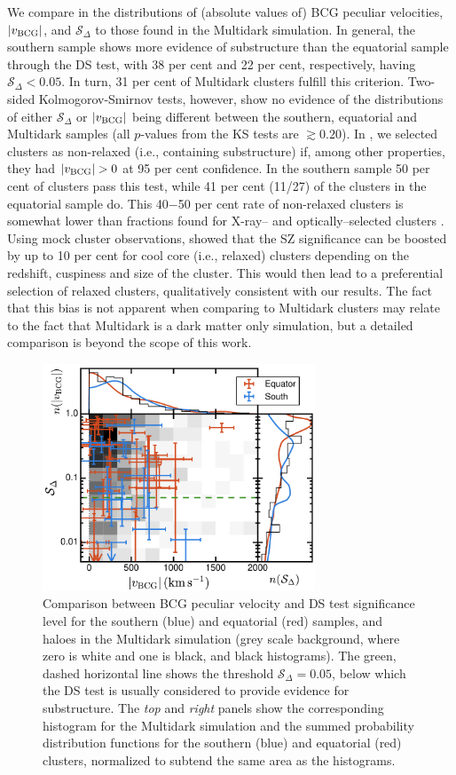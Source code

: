 We compare in  the distributions of (absolute values of) BCG peculiar velocities, $\lvert v_{\rm BCG}\rvert$, and $\mathcal{S}_\Delta$ to those found in the Multidark simulation. In general, the southern sample shows more evidence of substructure than the equatorial sample through the DS test, with 38 per cent and 22 per cent, respectively, having $\mathcal{S}_\Delta<0.05$. In turn, 31 per cent of Multidark clusters fulfill this criterion. Two-sided Kolmogorov-Smirnov tests, however, show no evidence of the distributions of either $\mathcal{S}_\Delta$ or $\lvert v_{\rm BCG}\rvert$ being different between the southern, equatorial and Multidark samples (all $p$-values from the KS tests are $\gtrsim0.20$). In \cite{sifon13}, we selected clusters as non-relaxed (i.e., containing substructure) if, among other properties, they had $\lvert v_{\rm BCG}\rvert>0$ at 95 per cent confidence. In the southern sample 50 per cent of clusters pass this test, while 41 per cent (11/27) of the clusters in the equatorial sample do. This 40$-$50 per cent rate of non-relaxed clusters is somewhat lower than fractions found for X-ray-- and optically--selected clusters \citep[e.g.,][]{bohringer10,wen13}. Using mock cluster observations, \cite{lin15} showed that the SZ significance can be boosted by up to 10 per cent for cool core (i.e., relaxed) clusters depending on the redshift, cuspiness and size of the cluster. This would then lead to a preferential selection of relaxed clusters, qualitatively consistent with our results. The fact that this bias is not apparent when comparing to Multidark clusters may relate to the fact that Multidark is a dark matter only simulation, but a detailed comparison is beyond the scope of this work.

\begin{figure}
 \centerline{\includegraphics[width=3.2in]{chapter3/vbcg_dstest-sims_full_dslog.pdf}}
\caption{Comparison between BCG peculiar velocity and DS test significance level for the southern 
(blue) and equatorial (red) samples, and haloes in the Multidark simulation (grey scale background, where zero is white and one is black, and black histograms). The green, dashed horizontal line shows the threshold $\mathcal{S}_\Delta=0.05$, below which the DS test is usually considered to provide evidence for substructure. The \textit{top} and \textit{right} panels show the corresponding histogram for the Multidark simulation and the summed probability distribution functions for the southern (blue) and equatorial (red) clusters, normalized to subtend the same area as the histograms. 
}
\label{f:substructure}
\end{figure}

